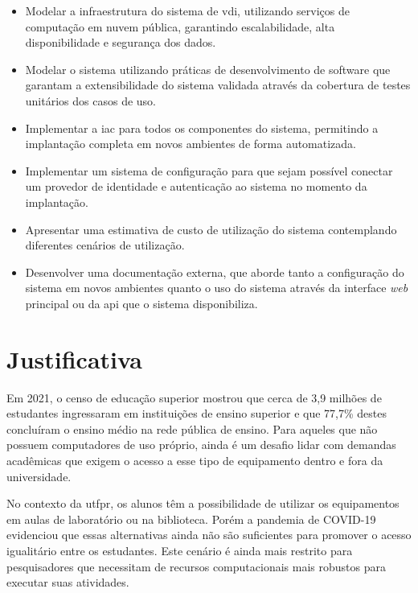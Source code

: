 \begin{itemize}
    \item Modelar a infraestrutura do sistema de \gls{vdi}, utilizando serviços de computação em nuvem pública, garantindo escalabilidade, alta disponibilidade e segurança dos dados.

    \item Modelar o sistema utilizando práticas de desenvolvimento de software que garantam a extensibilidade do sistema validada através da cobertura de testes unitários dos casos de uso.

    \item Implementar a \gls{iac} para todos os componentes do sistema, permitindo a implantação completa em novos ambientes de forma automatizada.

    \item Implementar um sistema de configuração para que sejam possível conectar um provedor de identidade e autenticação ao sistema no momento da implantação.

    \item Apresentar uma estimativa de custo de utilização do sistema contemplando diferentes cenários de utilização.

    \item Desenvolver uma documentação externa, que aborde tanto a configuração do sistema em novos ambientes quanto o uso do sistema através da interface \textit{web} principal ou da \gls{api} que o sistema disponibiliza.
\end{itemize}

\section{Justificativa}
\label{sec:justificativa}

Em 2021, o censo de educação superior mostrou que cerca de 3,9 milhões de estudantes ingressaram em
instituições de ensino superior e que 77,7\% destes concluíram o ensino médio na rede pública de
ensino. \citep{inep2021}
Para aqueles que não possuem computadores de uso próprio, ainda é um desafio lidar com demandas
acadêmicas que exigem o acesso a esse tipo de equipamento dentro e fora da universidade.

No contexto da \gls{utfpr}, os alunos têm a possibilidade de utilizar os equipamentos em aulas de
laboratório ou na biblioteca. Porém a pandemia de COVID-19 evidenciou que essas alternativas ainda
não são suficientes para promover o acesso igualitário entre os estudantes. Este cenário é ainda mais
restrito para pesquisadores que necessitam de recursos computacionais mais robustos para executar
suas atividades.

